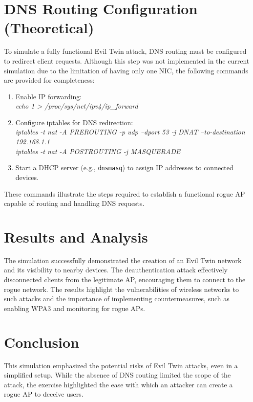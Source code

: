 \section{DNS Routing Configuration (Theoretical)}
To simulate a fully functional Evil Twin attack, DNS routing must be configured to redirect client requests. Although this step was not implemented in the current simulation due to the limitation of having only one NIC, the following commands are provided for completeness:

\begin{enumerate}
    \item Enable IP forwarding:\\
    \textit{echo 1 > /proc/sys/net/ipv4/ip_forward}

    \item Configure iptables for DNS redirection:\\
    \textit{iptables -t nat -A PREROUTING -p udp --dport 53 -j DNAT --to-destination 192.168.1.1}\\
    \textit{iptables -t nat -A POSTROUTING -j MASQUERADE}

    \item Start a DHCP server (e.g., \texttt{dnsmasq}) to assign IP addresses to connected devices.
\end{enumerate}

These commands illustrate the steps required to establish a functional rogue AP capable of routing and handling DNS requests.

\section{Results and Analysis}
The simulation successfully demonstrated the creation of an Evil Twin network and its visibility to nearby devices. The deauthentication attack effectively disconnected clients from the legitimate AP, encouraging them to connect to the rogue network. The results highlight the vulnerabilities of wireless networks to such attacks and the importance of implementing countermeasures, such as enabling WPA3 and monitoring for rogue APs.

\section{Conclusion}
This simulation emphasized the potential risks of Evil Twin attacks, even in a simplified setup. While the absence of DNS routing limited the scope of the attack, the exercise highlighted the ease with which an attacker can create a rogue AP to deceive users.

